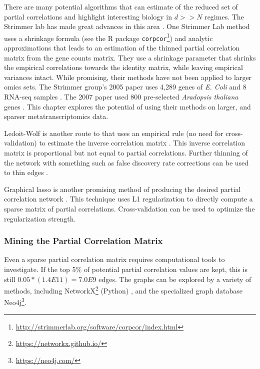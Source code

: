 There are many potential algorithms that can estimate of the reduced set of partial correlations and highlight interesting biology in $d >> N$ regimes.
The Strimmer lab has made great advances in this area \cite{schafer2001, schafer2005, opgen2007shrinkage}.
One Strimmer Lab method uses a shrinkage formula (see the R package \texttt{corpcor}\footnote{\url{http://strimmerlab.org/software/corpcor/index.html}}) and analytic approximations that leads to an estimation of the thinned partial correlation matrix from the gene counts matrix.
They use a shrinkage parameter that shrinks the empirical correlations towards the identity matrix, while leaving empirical variances intact.
While promising, their methods have not been applied to larger omics sets.
The Strimmer group's 2005 paper uses 4,289 genes of \textit{E. Coli} and 8 RNA-seq samples \cite{schafer2005}.
The 2007 paper used 800 pre-selected \textit{Aradopsis thaliana} genes \cite{opgen2007Aradopsis}.
This chapter explores the potential of using their methods on larger, and sparser metatranscriptomics data.

Ledoit-Wolf is another route to that uses an empirical rule (no need for cross-validation) to estimate the inverse correlation matrix \cite{ledoit2003}.
This inverse correlation matrix is proportional but not equal to partial correlations.
Further thinning of the network with something such as false discovery rate corrections can be used to thin edges \cite{opgen2007Aradopsis}.

Graphical lasso is another promising method of producing the desired partial correlation network \cite{friedman2008}.
This technique uses L1 regularization to directly compute a sparse matrix of partial correlations.
Cross-validation can be used to optimize the regularization strength.

\subsubsection{Mining the Partial Correlation Matrix}
Even a sparse partial correlation matrix requires computational tools to investigate.
If the top 5\% of potential partial correlation values are kept, this is still $0.05*(1.4E11) = 7.0E9$ edges.
The graphs can be explored by a variety of methods, including NetworkX\footnote{\url{https://networkx.github.io/}} (Python) \cite{schult2008}, and the specialized graph database Neo4j\footnote{\url{https://neo4j.com/}}.

